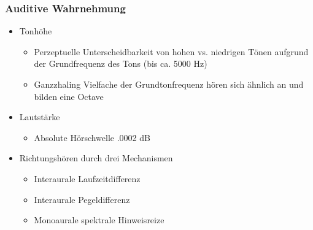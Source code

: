 \subsubsection{Auditive Wahrnehmung}
\begin{itemize}
	\item Tonhöhe
		\begin{itemize}
			\item Perzeptuelle Unterscheidbarkeit von hohen vs. niedrigen Tönen aufgrund der Grundfrequenz des Tons (bis ca. 5000 Hz)
			\item Ganzzhaling Vielfache der Grundtonfrequenz hören sich ähnlich an und bilden eine Octave
		\end{itemize}
	\item Lautstärke
		\begin{itemize}
			\item Absolute Hörschwelle .0002 dB
		\end{itemize}
	\item Richtungshören durch drei Mechanismen
		\begin{itemize}
			\item Interaurale Laufzeitdifferenz
			\item Interaurale Pegeldifferenz
			\item Monoaurale spektrale Hinweisreize
		\end{itemize}
\end{itemize}










